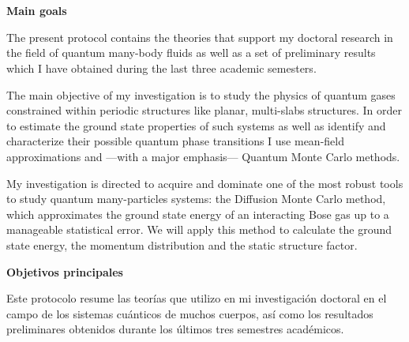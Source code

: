 

\chapter*{}

\vspace{-1cm}

\begin{center}
  \fontsize{\chaptitlefontsize}{0}\selectfont \textbf{Main goals}
\end{center}

The present protocol contains the theories that support my doctoral research in
the field of quantum many-body fluids as well as a set of preliminary results
which I have obtained during the last three academic semesters.

The main objective of my investigation is to study the physics of quantum gases
constrained within periodic structures like planar, multi-slabs structures. In
order to estimate the ground state properties of such systems as well as
identify and characterize their possible quantum phase transitions I use
mean-field approximations and ---with a major emphasis--- Quantum Monte Carlo
methods.

My investigation is directed to acquire and dominate one of the most robust
tools to study quantum many-particles systems: the Diffusion Monte Carlo method,
which approximates the ground state energy of an interacting Bose gas up to a
manageable statistical error. We will apply this method to calculate the ground
state energy, the momentum distribution and the static structure factor.


\vspace{1cm}


\begin{center}
  \fontsize{\chaptitlefontsize}{0}\selectfont \textbf{Objetivos principales}
\end{center}


Este protocolo resume las teorías que utilizo en mi investigación doctoral en el
campo de los sistemas cuánticos de muchos cuerpos, así como los resultados
preliminares obtenidos durante los últimos tres semestres académicos.

